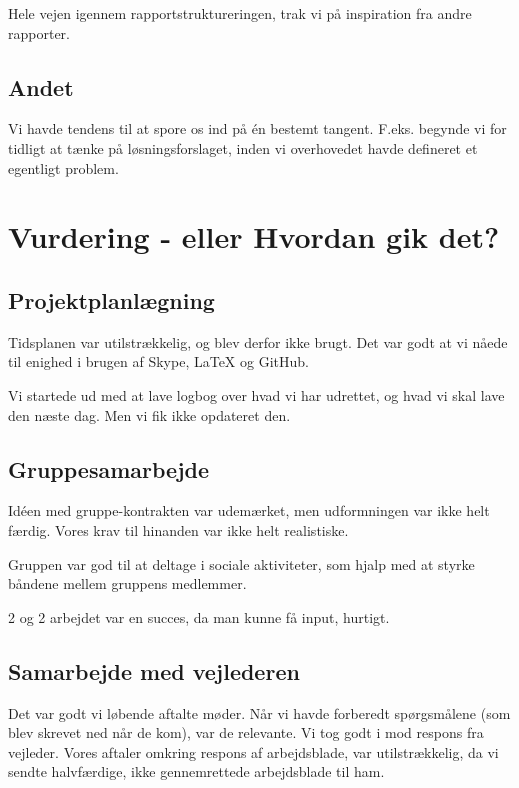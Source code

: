 Hele vejen igennem rapportstruktureringen, trak vi på inspiration fra andre rapporter.

\subsection{Andet}

Vi havde tendens til at spore os ind på én bestemt tangent. F.eks. begynde vi for tidligt at tænke på løsningsforslaget, inden vi overhovedet havde defineret et egentligt problem.

\section{Vurdering - eller Hvordan gik det?}

\subsection{Projektplanlægning}

Tidsplanen var utilstrækkelig, og blev derfor ikke brugt. Det var godt at vi nåede til enighed i brugen af Skype, LaTeX og GitHub.

Vi startede ud med at lave logbog over hvad vi har udrettet, og hvad vi skal lave den næste dag. Men vi fik ikke opdateret den.

\subsection{Gruppesamarbejde}

Idéen med gruppe-kontrakten var udemærket, men udformningen var ikke helt færdig. Vores krav til hinanden var ikke helt realistiske.

Gruppen var god til at deltage i sociale aktiviteter, som hjalp med at styrke båndene mellem gruppens medlemmer.

2 og 2 arbejdet var en succes, da man kunne få input, hurtigt.


\subsection{Samarbejde med vejlederen}

Det var godt vi løbende aftalte møder. Når vi havde forberedt spørgsmålene (som blev skrevet ned når de kom), var de relevante. Vi tog godt i mod respons fra vejleder. Vores aftaler omkring respons af arbejdsblade, var utilstrækkelig, da vi sendte halvfærdige, ikke gennemrettede arbejdsblade til ham.

